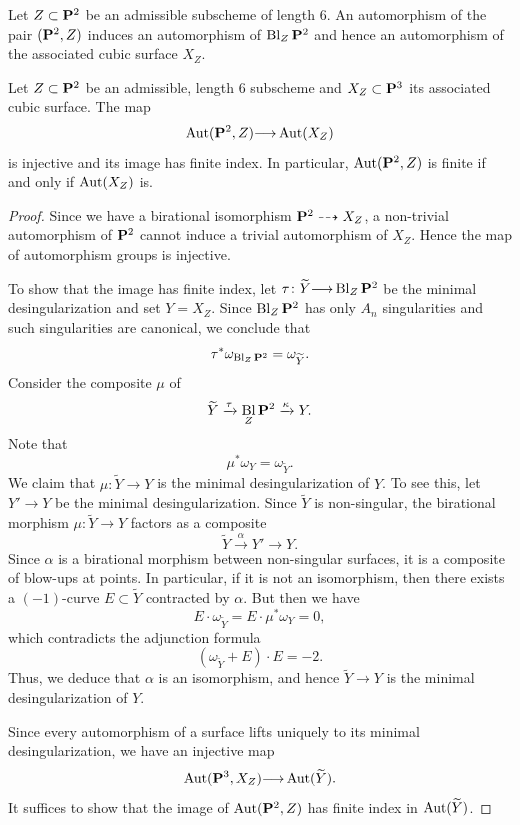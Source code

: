 \documentclass[12pt,reqno]{amsart}
\DeclareMathOperator{\Bl}{Bl}
\renewcommand{\to}{{\longrightarrow}}
\numberwithin{equation}{section}
\begin{document}
Let $Z \subset \P^2$ be an admissible subscheme of length 6.
An automorphism of the pair $(\P^2, Z)$ induces an automorphism of $\Bl_Z\P^2$ and hence an automorphism of the associated cubic surface $X_Z$.

\begin{proposition}
  \label{prop:good} Let $Z \subset \P^2$ be an admissible, length $6$
  subscheme and $X_Z \subset \P^3$ its associated cubic surface.
  The map
  \[ \Aut(\P^2, Z) \to \Aut(X_Z)\]
  is injective and its image has finite index.
  In particular, $\Aut(\P^2, Z)$ is finite if and only if $\Aut(X_Z)$ is.
\end{proposition}

\begin{proof}
  Since we have a birational isomorphism $\P^2 \dashrightarrow X_Z$, a non-trivial automorphism of $\P^2$ cannot induce a trivial automorphism of $X_Z$.
  Hence the map of automorphism groups is injective.

  To show that the image has finite index, let $\tau \colon \widetilde Y \to \Bl_Z\P^2$ be the minimal desingularization and set $Y = X_Z$.
  Since $\Bl_Z\P^2$ has only $A_n$ singularities and such singularities are canonical, we conclude that
  \[\tau^* \omega_{\Bl_Z\P^2} = \omega_{\widetilde Y}.\]
  Consider the composite $\mu$ of 
  \[ \widetilde Y \xrightarrow{\tau} \Bl_Z \P^2 \xrightarrow{\kappa} Y.\]
  Note that
  \[ \mu^* \omega_Y = \omega_{\widetilde Y}.\]
  We claim that $\mu \colon \widetilde Y \to Y$ is the minimal desingularization of $Y$.
  To see this, let $Y' \to Y$ be the minimal desingularization.
  Since $\widetilde Y$ is non-singular, the birational morphism $\mu \colon \widetilde Y \to Y$ factors as a composite
  \[ \widetilde Y \xrightarrow{\alpha} Y' \to Y.\]
  Since $\alpha$ is a birational morphism between non-singular surfaces, it is a composite of blow-ups at points.
  In particular, if it is not an isomorphism, then there exists a $(-1)$-curve $E \subset \widetilde Y$ contracted by $\alpha$.
  But then we have 
  \[ E \cdot \omega_{\widetilde Y} = E \cdot \mu^* \omega_Y = 0,\]
  which contradicts the adjunction formula
  \[ \left(\omega_{\widetilde Y}+ E\right) \cdot E = -2.\]
  Thus, we deduce that $\alpha$ is an isomorphism, and hence $\widetilde Y \to Y$ is the minimal desingularization of $Y$.
  
  Since every automorphism of a surface lifts uniquely to its minimal
  desingularization, we have an injective map
  \[ \Aut(\P^3, X_Z) \to \Aut(\widetilde Y).\]
  It suffices to show that the image of $\Aut(\P^2, Z)$ has finite index in $\Aut(\widetilde Y)$.


\end{proof}
\end{document}
